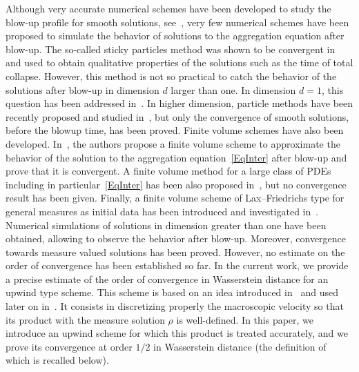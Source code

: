 \documentclass[11pt]{article}
\theoremstyle{definition}
\numberwithin{equation}{section}
\begin{document}
Although very accurate numerical schemes have been developed to study the blow-up profile for smooth solutions, see~\cite{Huang2,Huang1}, very few numerical schemes have been proposed to simulate the behavior of solutions to the aggregation equation after blow-up. The so-called sticky particles method was shown to be convergent in~\cite{Carrillo} and used to obtain qualitative properties of the solutions such as the time of total collapse. However, this method is not so practical to catch the behavior of the solutions after blow-up in dimension $d$ larger than one. In dimension $d=1$, this question has been addressed in~\cite{NoDEA}. In higher dimension, particle methods have been recently proposed and studied in~\cite{CB,Freda}, but only the convergence of smooth solutions, before the blowup time, has been proved. Finite volume schemes have also been developed. In~\cite{sinum}, the authors propose a finite volume scheme to approximate the behavior of the solution to the aggregation equation~\eqref{EqInter} after blow-up and prove that it is convergent. A finite volume method for a large class of PDEs including in particular~\eqref{EqInter} has been also proposed in~\cite{CCH}, but no convergence result has been given. Finally, a finite volume scheme of Lax--Friedrichs type for general measures as initial data has been introduced and investigated in~\cite{CJLV}. Numerical simulations of solutions in dimension greater than one have been obtained, allowing to observe the behavior after blow-up. Moreover, convergence towards measure valued solutions has been proved. However, no estimate on the order of convergence has been established so far. In the current work, we provide a precise estimate of the order of convergence in Wasserstein distance for an upwind type scheme. This scheme is based on an idea introduced in~\cite{NoDEA} and used later on in~\cite{CJLV,sinum}. It consists in discretizing properly the macroscopic velocity so that its product with the measure solution $\rho$ is well-defined. In this paper, we introduce an upwind scheme for which this product is treated accurately, and we prove its convergence at order $1/2$ in Wasserstein distance (the definition of which is recalled below).
\end{document}

